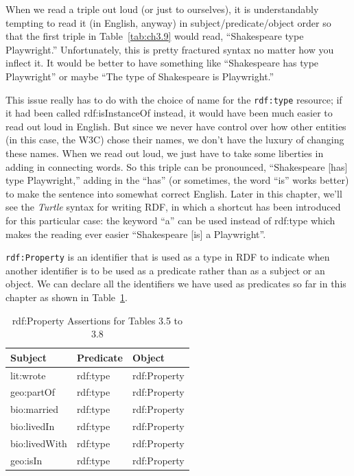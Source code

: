 When we read a triple out loud (or just to ourselves), it is
understandably tempting to read it (in English, anyway) in
subject/predicate/object order so that the first triple in Table~\ref{tab:ch3.9}
would read, ``Shakespeare type Playwright.'' Unfortunately, this is
pretty fractured syntax no matter how you inflect it. It would be better
to have something like ``Shakespeare has type Playwright'' or maybe
``The type of Shakespeare is Playwright.''

This issue really has to do with the choice of name for the \texttt{rdf:type}
resource; if it had been called rdf:isInstanceOf instead, it would have
been much easier to read out loud in English. But since we never have
control over how other entities (in this case, the W3C) chose their
names, we don't have the luxury of changing these names. When we read
out loud, we just have to take some liberties in adding in connecting
words. So this triple can be pronounced, ``Shakespeare {[}has{]} type
Playwright,'' adding in the ``has'' (or sometimes, the word ``is'' works
better) to make the sentence into somewhat correct English. Later in
this chapter, we'll see the \emph{Turtle} syntax for writing RDF, in which a
shortcut has been introduced for this particular case: the keyword ``a''
can be used instead of rdf:type which makes the reading ever easier
``Shakespeare {[}is{]} a Playwright''.

\texttt{rdf:Property} is an identifier that is used as a type in RDF to indicate
when another identifier is to be used as a predicate rather than as a
subject or an object. We can declare all the identifiers we have used as
predicates so far in this chapter as shown in Table~\ref{tab:ch3.11}.

\begin{table}[h]
\centering
\begin{tabular}{||l l l ||} 
 \hline
 Subject&Predicate&Object \\ [0.5ex] 
 \hline\hline
lit:wrote&rdf:type&rdf:Property\\
geo:partOf&rdf:type&rdf:Property\\
bio:married&rdf:type&rdf:Property\\
bio:livedIn&rdf:type&rdf:Property\\
bio:livedWith&rdf:type&rdf:Property\\
geo:isIn&rdf:type&rdf:Property\\
\hline
\end{tabular}
\caption{rdf:Property Assertions for Tables 3.5 to 3.8}
\label{tab:ch3.11}
\end{table}


